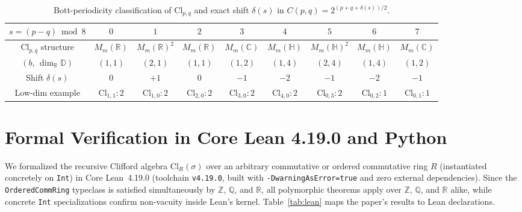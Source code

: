 \documentclass[11pt]{article}
\theoremstyle{definition}
\newcommand{\Cl}{\mathrm{Cl}}
\newcommand{\R}{\mathbb{R}}
\newcommand{\Q}{\mathbb{Q}}
\newcommand{\Z}{\mathbb{Z}}
\newcommand{\C}{\mathbb{C}}
\newcommand{\HH}{\mathbb{H}}
\begin{document}
\begin{table}[htbp]
\centering
\caption{Bott-periodicity classification of $\Cl_{p,q}$ and exact shift $\delta(s)$ in $C(p,q)=2^{(p+q+\delta(s))/2}$.}
\label{tab:bott}
\small
\begin{tabular}{@{}ccccccccc@{}}
\toprule
$s=(p-q)\bmod 8$ & $0$ & $1$ & $2$ & $3$ & $4$ & $5$ & $6$ & $7$ \\
\midrule
$\Cl_{p,q}$ structure & $M_m(\R)$ & $M_m(\R)^2$ & $M_m(\R)$ & $M_m(\C)$ & $M_m(\HH)$ & $M_m(\HH)^2$ & $M_m(\HH)$ & $M_m(\C)$ \\
$(b,\,\dim_\R\mathbb{D})$ & $(1,1)$ & $(2,1)$ & $(1,1)$ & $(1,2)$ & $(1,4)$ & $(2,4)$ & $(1,4)$ & $(1,2)$ \\
Shift $\delta(s)$ & $0$ & $+1$ & $0$ & $-1$ & $-2$ & $-1$ & $-2$ & $-1$ \\
Low-dim example & $\Cl_{1,1}:2$ & $\Cl_{1,0}:2$ & $\Cl_{2,0}:2$ & $\Cl_{3,0}:2$ & $\Cl_{4,0}:2$ & $\Cl_{0,3}:2$ & $\Cl_{0,2}:1$ & $\Cl_{0,1}:1$ \\
\bottomrule
\end{tabular}
\end{table}

\section{Formal Verification in Core Lean 4.19.0 and Python}

We formalized the recursive Clifford algebra $\Cl_R(\sigma)$ over an arbitrary commutative or ordered commutative ring $R$ (instantiated concretely on \texttt{Int}) in Core Lean~4.19.0 (toolchain \texttt{v4.19.0}, built with \texttt{-DwarningAsError=true} and zero external dependencies). Since the \texttt{OrderedCommRing} typeclass is satisfied simultaneously by $\Z$, $\Q$, and $\R$, all polymorphic theorems apply over $\Z$, $\Q$, and $\R$ alike, while concrete \texttt{Int} specializations confirm non-vacuity inside Lean's kernel. Table~\ref{tab:lean} maps the paper's results to Lean declarations.
\end{document}
